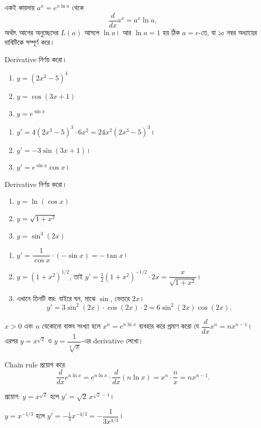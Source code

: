 \documentclass[11pt]{article}
\begin{document}
একই কায়দায় $a^{x} = e^{x\ln a}$ থেকে
\[
  \frac{d}{dx}a^{x} = a^{x}\ln a ,
\]
অর্থাৎ আগের অনুচ্ছেদের $L(a)$ আসলে $\ln a$। আর $\ln a = 1$ হয় ঠিক $a = e$-তে,
যা ১০ নম্বর অধ্যায়ের দাবিটিকে সম্পূর্ণ করে।

 Derivative নির্ণয় করো।
\begin{enumerate}
  \item $y = \left( 2x^{3} - 5 \right)^{4}$
  \item $y = \cos\left( 3x + 1 \right)$
  \item $y = e^{\sin x}$
\end{enumerate}

\begin{sol}
\begin{enumerate}
  \item $y' = 4\left( 2x^{3}-5 \right)^{3} \cdot 6x^{2}
        = 24x^{2}\left( 2x^{3}-5 \right)^{3}$।
  \item $y' = -3\sin(3x+1)$।
  \item $y' = e^{\sin x}\cos x$।
\end{enumerate}
\end{sol}

 Derivative নির্ণয় করো।
\begin{enumerate}
  \item $y = \ln(\cos x)$
  \item $y = \sqrt{1+x^{2}}$
  \item $y = \sin^{3}(2x)$
\end{enumerate}

\begin{sol}
\begin{enumerate}
  \item $y' = \dfrac{1}{\cos x} \cdot (-\sin x) = -\tan x$।
  \item $y = \left( 1+x^{2} \right)^{1/2}$, তাই
        $y' = \tfrac{1}{2}\left( 1+x^{2} \right)^{-1/2} \cdot 2x
        = \dfrac{x}{\sqrt{1+x^{2}}}$।
  \item এখানে তিনটি স্তর: বাইরে ঘন, মাঝে $\sin$, ভেতরে $2x$।
        \[
          y' = 3\sin^{2}(2x) \cdot \cos(2x) \cdot 2 = 6\sin^{2}(2x)\cos(2x) .
        \]
\end{enumerate}
\end{sol}

 $x > 0$ এবং $n$ যেকোনো বাস্তব সংখ্যা হলে $x^{n} = e^{n\ln x}$ ব্যবহার
করে প্রমাণ করো যে $\dfrac{d}{dx}x^{n} = nx^{n-1}$। এরপর $y = x^{\sqrt{2}}$ ও
$y = \dfrac{1}{\sqrt[3]{x}}$-এর derivative লেখো।

\begin{sol}
Chain rule প্রয়োগ করে
\[
  \frac{d}{dx}e^{n\ln x} = e^{n\ln x}\cdot\frac{d}{dx}\left( n\ln x \right)
  = x^{n} \cdot \frac{n}{x} = nx^{n-1} .
\]

প্রয়োগ: $y = x^{\sqrt{2}}$ হলে $y' = \sqrt{2}\,x^{\sqrt{2}-1}$।

$y = x^{-1/3}$ হলে $y' = -\tfrac{1}{3}x^{-4/3} = -\dfrac{1}{3x^{4/3}}$।
\end{sol}
\end{document}
